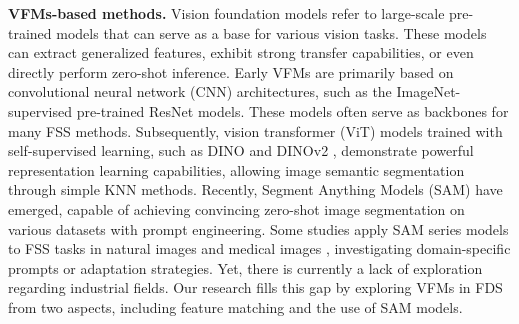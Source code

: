 \noindent \textbf{VFMs-based methods.}
Vision foundation models refer to large-scale pre-trained models that can serve as a base for various vision tasks. These models can extract generalized features, exhibit strong transfer capabilities, or even directly perform zero-shot inference. Early VFMs are primarily based on convolutional neural network (CNN) architectures, such as the ImageNet\cite{deng2009imagenet}-supervised pre-trained ResNet \cite{he2016deep} models. These models often serve as backbones for many FSS methods. Subsequently, vision transformer (ViT) \cite{alexey2020image} models trained with self-supervised learning, such as DINO \cite{caron2021emerging} and DINOv2 \cite{oquab2023dinov2}, demonstrate powerful representation learning capabilities, allowing image semantic segmentation through simple KNN methods. Recently, Segment Anything Models (SAM) \cite{kirillov2023segment,ravi2024sam,zhao2023fast,zhang2023faster,xiong2024efficientsam,songa2024sam} have emerged, capable of achieving convincing zero-shot image segmentation on various datasets with prompt engineering. Some studies apply SAM series models to FSS tasks in natural images \cite{zhang2023personalize,liu2023matcher} and medical images \cite{zhu2024medical, zhao2024retrieval,bai2024fs}, investigating domain-specific prompts or adaptation strategies. Yet, there is currently a lack of exploration regarding industrial fields. Our research fills this gap by exploring VFMs in FDS from two aspects, including feature matching and the use of SAM models.

